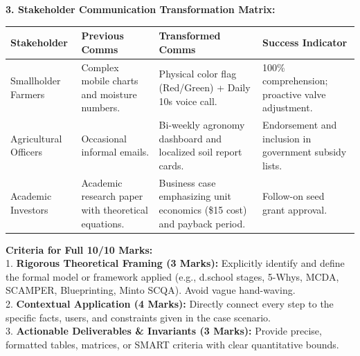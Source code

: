 \begin{solbox}
\textbf{3. Stakeholder Communication Transformation Matrix:}\\
{\small
\begin{tabularx}{\linewidth}{|l|X|X|X|} \hline
\textbf{Stakeholder} & \textbf{Previous Comms} & \textbf{Transformed Comms} & \textbf{Success Indicator} \\ \hline
Smallholder Farmers & Complex mobile charts and moisture numbers. & Physical color flag (Red/Green) + Daily 10s voice call. & 100\% comprehension; proactive valve adjustment. \\ \hline
Agricultural Officers & Occasional informal emails. & Bi-weekly agronomy dashboard and localized soil report cards. & Endorsement and inclusion in government subsidy lists. \\ \hline
Academic Investors & Academic research paper with theoretical equations. & Business case emphasizing unit economics (\$15 cost) and payback period. & Follow-on seed grant approval. \\ \hline
\end{tabularx}\par}
\end{solbox}

\begin{examinertip}
\textbf{Criteria for Full 10/10 Marks:}\\
1. \textbf{Rigorous Theoretical Framing (3 Marks):} Explicitly identify and define the formal model or framework applied (e.g., d.school stages, 5-Whys, MCDA, SCAMPER, Blueprinting, Minto SCQA). Avoid vague hand-waving.\\
2. \textbf{Contextual Application (4 Marks):} Directly connect every step to the specific facts, users, and constraints given in the case scenario.\\
3. \textbf{Actionable Deliverables \& Invariants (3 Marks):} Provide precise, formatted tables, matrices, or SMART criteria with clear quantitative bounds.
\end{examinertip}
